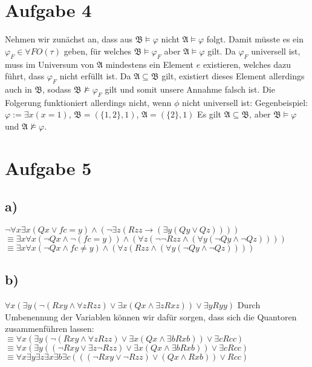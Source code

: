 \documentclass[11pt, a4paper]{article}
\renewcommand{\v}{\vee}
\newcommand{\n}{\wedge}
\begin{document}
\section*{Aufgabe 4}
Nehmen wir zunächst an, dass aus $\mathfrak{B} \vDash \varphi$ nicht $\mathfrak{A} \vDash \varphi$ folgt. Damit müsste es ein $\varphi_F \in \forall FO(\tau)$ geben, für welches $\mathfrak{B} \vDash \varphi_F$ aber $\mathfrak{A} \vDash \varphi$ gilt. Da $\varphi_F$ universell ist, muss im Universum von $\mathfrak{A}$ mindestens ein Element $e$ existieren, welches dazu führt, dass $\varphi_F$ nicht erfüllt ist. Da $\mathfrak{A} \subseteq \mathfrak{B}$ gilt, existiert dieses Element allerdings auch in $\mathfrak{B}$, sodass $\mathfrak{B} \nvDash \varphi_F$ gilt und somit unsere Annahme falsch ist.\newline\newline
Die Folgerung funktioniert allerdings nicht, wenn $\phi$ nicht universell ist:\newline
Gegenbeispiel: $\varphi := \exists x(x=1)$, $\mathfrak{B}=(\{1,2\}, 1)$, $\mathfrak{A}=(\{2\}, 1)$\newline
Es gilt $\mathfrak{A} \subseteq \mathfrak{B}$, aber $\mathfrak{B} \vDash \varphi$ und $\mathfrak{A} \nvDash \varphi$.

\section*{Aufgabe 5}
\subsection*{a)}
$\neg \forall x \exists x (Qx \v fc = y) \n (\neg \exists z (Rzz \to (\exists y (Qy \v Qz))))$ \newline
$\equiv \exists x \forall x (\neg Qx \n \neg(fc = y)) \n ( \forall z (\neg\neg Rzz \n (\forall y (\neg Qy \n \neg Qz))))$\newline
$\equiv \exists x \forall x (\neg Qx \n fc \neq y) \n ( \forall z ( Rzz \n (\forall y (\neg Qy \n \neg Qz))))$

\subsection*{b)}
$\forall x (\exists y (\neg(Rxy \n \forall z Rzz) \v \exists x (Qx \n \exists z Rxz)) \v \exists y Ryy)$\newline
Durch Umbenennung der Variablen können wir dafür sorgen, dass sich die Quantoren zusammenführen lassen:\newline
$\equiv \forall x (\exists y (\neg(Rxy \n \forall z Rzz) \v \exists x (Qx \n \exists b Rxb)) \v \exists c Rcc)$\newline
$\equiv \forall x (\exists y ((\neg Rxy \v \exists z \neg Rzz) \v \exists x (Qx \n \exists b Rxb)) \v \exists c Rcc)$\newline
$\equiv \forall x \exists y \exists z \exists x \exists b \exists c (((\neg Rxy \v \neg Rzz) \v (Qx \n Rxb)) \v Rcc)$
\end{document}
